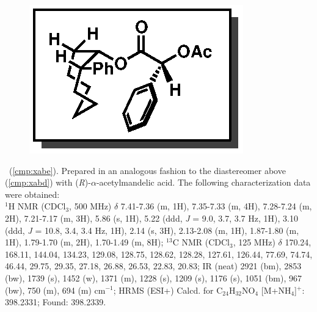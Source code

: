 \vspace{10pt}
\begin{figure}
  \vspace{-22pt}
  \begin{center}
    \includegraphics[scale=0.8]{chp_asymmetric/images/xabe}
  \end{center}
  \vspace{-25pt}
\end{figure}\noindent \textbf{\CMPxabe}\ (\ref{cmp:xabe}). Prepared in an
analogous fashion to the diastereomer above (\ref{cmp:xabd}) with
(\textit{R})-$\alpha$-acetylmandelic acid. The following characterization data
were obtained: \\
$^1$H NMR (CDCl$_3$, 500 MHz) $\delta$ 7.41-7.36 (m, 1H), 7.35-7.33 (m, 4H),
7.28-7.24 (m, 2H), 7.21-7.17 (m, 3H), 5.86 (s, 1H), 5.22 (ddd, \textit{J} = 9.0,
3.7, 3.7 Hz, 1H), 3.10 (ddd, \textit{J} = 10.8, 3.4, 3.4 Hz, 1H), 2.14 (s, 3H), 2.13-2.08 (m, 1H), 1.87-1.80 (m, 1H), 1.79-1.70 (m, 2H), 1.70-1.49 (m, 8H); $^{13}$C NMR (CDCl$_3$, 125 MHz) $\delta$ 170.24, 168.11, 144.04, 134.23, 129.08, 128.75, 128.62, 128.28, 127.61, 126.44, 77.69, 74.74, 46.44, 29.75, 29.35, 27.18, 26.88, 26.53, 22.83, 20.83; IR (neat) 2921 (bm), 2853 (bw), 1739 (s), 1452 (w), 1371 (m), 1228 (s), 1209 (s), 1176 (s), 1051 (bm), 967 (bw), 750 (m), 694 (m) cm$^{-1}$; HRMS (ESI+) Calcd. for C$_{24}$H$_{32}$NO$_4$ [M+NH$_4$]$^+$: 398.2331; Found: 398.2339.

